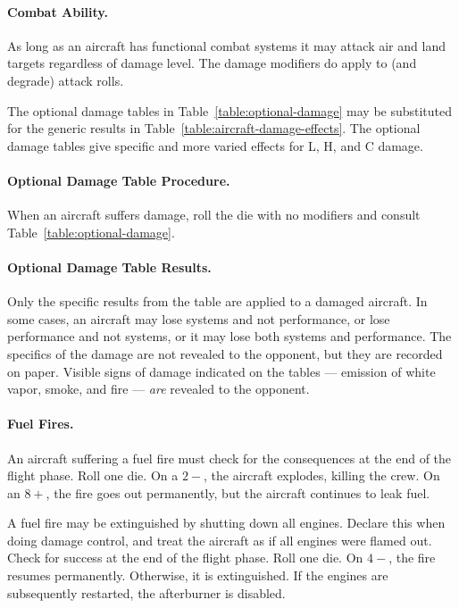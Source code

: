 \begin{advancedrules}
{\paragraph{Combat Ability.} As long as an aircraft has functional combat systems it may attack air and land targets regardless of damage level. The damage modifiers do apply to (and degrade) attack rolls.

}{

The optional damage tables in Table~\ref{table:optional-damage} may be substituted for the generic results in Table~\ref{table:aircraft-damage-effects}. The optional damage tables give specific and more varied effects for L, H, and C damage. 

\paragraph{Optional Damage Table Procedure.}
When an aircraft suffers damage, roll the die with no modifiers and consult Table~\ref{table:optional-damage}.

\paragraph{Optional Damage Table Results.} Only the specific results from the table are applied to a damaged aircraft. In some cases, an aircraft may lose systems and not performance, or lose performance and not systems, or it may lose both systems and performance. The specifics of the damage are not revealed to the opponent, but they are recorded on paper. Visible signs of damage indicated on the tables --- emission of white vapor, smoke, and fire --- \emph{are} revealed to the opponent.

\paragraph{Fuel Fires.} 
An aircraft suffering a fuel fire must check for the consequences at the end of the flight phase. Roll one die. On a $2-$, the aircraft explodes, killing the crew. On an $8+$, the fire goes out permanently, but the aircraft continues to leak fuel.

A fuel fire may be extinguished by shutting down all engines. Declare this when doing damage control, and treat the aircraft as if all engines were flamed out. Check for success at the end of the flight phase. Roll one die. On $4-$, the fire resumes permanently. Otherwise, it is extinguished. If the engines are subsequently restarted, the afterburner is disabled.

}
\end{advancedrules}
